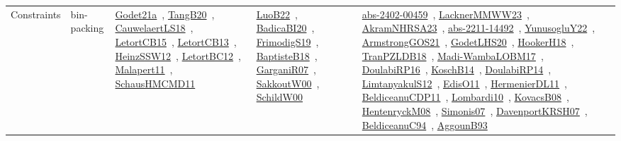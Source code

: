 {\begin{longtable}{lp{3cm}>{\raggedright\arraybackslash}p{6cm}>{\raggedright\arraybackslash}p{6cm}>{\raggedright\arraybackslash}p{8cm}}
Constraints & bin-packing & \href{works/Godet21a.pdf}{Godet21a}~\cite{Godet21a}, \href{works/TangB20.pdf}{TangB20}~\cite{TangB20}, \href{works/CauwelaertLS18.pdf}{CauwelaertLS18}~\cite{CauwelaertLS18}, \href{works/LetortCB15.pdf}{LetortCB15}~\cite{LetortCB15}, \href{works/LetortCB13.pdf}{LetortCB13}~\cite{LetortCB13}, \href{works/HeinzSSW12.pdf}{HeinzSSW12}~\cite{HeinzSSW12}, \href{works/LetortBC12.pdf}{LetortBC12}~\cite{LetortBC12}, \href{works/Malapert11.pdf}{Malapert11}~\cite{Malapert11}, \href{works/SchausHMCMD11.pdf}{SchausHMCMD11}~\cite{SchausHMCMD11} & \href{works/LuoB22.pdf}{LuoB22}~\cite{LuoB22}, \href{works/BadicaBI20.pdf}{BadicaBI20}~\cite{BadicaBI20}, \href{works/FrimodigS19.pdf}{FrimodigS19}~\cite{FrimodigS19}, \href{works/BaptisteB18.pdf}{BaptisteB18}~\cite{BaptisteB18}, \href{works/GarganiR07.pdf}{GarganiR07}~\cite{GarganiR07}, \href{works/SakkoutW00.pdf}{SakkoutW00}~\cite{SakkoutW00}, \href{works/SchildW00.pdf}{SchildW00}~\cite{SchildW00} & \href{works/abs-2402-00459.pdf}{abs-2402-00459}~\cite{abs-2402-00459}, \href{works/LacknerMMWW23.pdf}{LacknerMMWW23}~\cite{LacknerMMWW23}, \href{works/AkramNHRSA23.pdf}{AkramNHRSA23}~\cite{AkramNHRSA23}, \href{works/abs-2211-14492.pdf}{abs-2211-14492}~\cite{abs-2211-14492}, \href{works/YunusogluY22.pdf}{YunusogluY22}~\cite{YunusogluY22}, \href{works/ArmstrongGOS21.pdf}{ArmstrongGOS21}~\cite{ArmstrongGOS21}, \href{works/GodetLHS20.pdf}{GodetLHS20}~\cite{GodetLHS20}, \href{works/HookerH18.pdf}{HookerH18}~\cite{HookerH18}, \href{works/TranPZLDB18.pdf}{TranPZLDB18}~\cite{TranPZLDB18}, \href{works/Madi-WambaLOBM17.pdf}{Madi-WambaLOBM17}~\cite{Madi-WambaLOBM17}, \href{works/DoulabiRP16.pdf}{DoulabiRP16}~\cite{DoulabiRP16}, \href{works/KoschB14.pdf}{KoschB14}~\cite{KoschB14}, \href{works/DoulabiRP14.pdf}{DoulabiRP14}~\cite{DoulabiRP14}, \href{works/LimtanyakulS12.pdf}{LimtanyakulS12}~\cite{LimtanyakulS12}, \href{works/EdisO11.pdf}{EdisO11}~\cite{EdisO11}, \href{works/HermenierDL11.pdf}{HermenierDL11}~\cite{HermenierDL11}, \href{works/BeldiceanuCDP11.pdf}{BeldiceanuCDP11}~\cite{BeldiceanuCDP11}, \href{works/Lombardi10.pdf}{Lombardi10}~\cite{Lombardi10}, \href{works/KovacsB08.pdf}{KovacsB08}~\cite{KovacsB08}, \href{works/HentenryckM08.pdf}{HentenryckM08}~\cite{HentenryckM08}, \href{works/Simonis07.pdf}{Simonis07}~\cite{Simonis07}, \href{works/DavenportKRSH07.pdf}{DavenportKRSH07}~\cite{DavenportKRSH07}, \href{works/BeldiceanuC94.pdf}{BeldiceanuC94}~\cite{BeldiceanuC94}, \href{works/AggounB93.pdf}{AggounB93}~\cite{AggounB93}\\

\end{longtable}}
